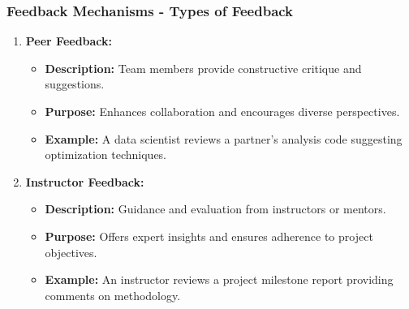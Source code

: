 \documentclass{beamer}
\begin{document}
\begin{frame}[fragile]
    \frametitle{Feedback Mechanisms - Types of Feedback}
    \begin{enumerate}
        \item \textbf{Peer Feedback:}
            \begin{itemize}
                \item \textbf{Description:} Team members provide constructive critique and suggestions.
                \item \textbf{Purpose:} Enhances collaboration and encourages diverse perspectives.
                \item \textbf{Example:} A data scientist reviews a partner's analysis code suggesting optimization techniques.
            \end{itemize}
        \item \textbf{Instructor Feedback:}
            \begin{itemize}
                \item \textbf{Description:} Guidance and evaluation from instructors or mentors.
                \item \textbf{Purpose:} Offers expert insights and ensures adherence to project objectives.
                \item \textbf{Example:} An instructor reviews a project milestone report providing comments on methodology.
            \end{itemize}
    \end{enumerate}
\end{frame}
\end{document}

